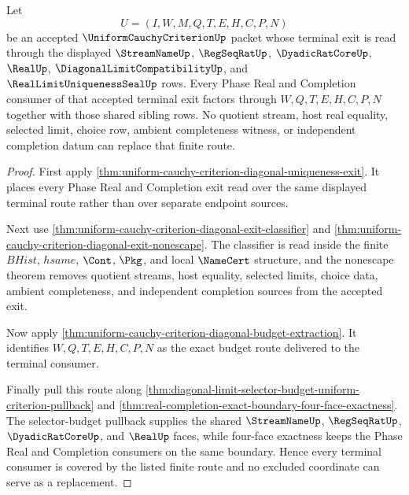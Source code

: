 \begin{theorem}
\label{thm:uniform-cauchy-criterion-exit-route-consumer-coverage}
Let
$$
U=(I,W,M,Q,T,E,H,C,P,N)
$$
be an accepted $\UniformCauchyCriterionUp$ packet whose terminal exit is read through the displayed $\StreamNameUp$, $\RegSeqRatUp$, $\DyadicRatCoreUp$, $\RealUp$, $\DiagonalLimitCompatibilityUp$, and $\RealLimitUniquenessSealUp$ rows. Every Phase Real and Completion consumer of that accepted terminal exit factors through $W,Q,T,E,H,C,P,N$ together with those shared sibling rows. No quotient stream, host real equality, selected limit, choice row, ambient completeness witness, or independent completion datum can replace that finite route.
\end{theorem}
\begin{proof}
First apply \autoref{thm:uniform-cauchy-criterion-diagonal-uniqueness-exit}. It places every Phase Real and Completion exit read over the same displayed terminal route rather than over separate endpoint sources.

Next use \autoref{thm:uniform-cauchy-criterion-diagonal-exit-classifier} and \autoref{thm:uniform-cauchy-criterion-diagonal-exit-nonescape}. The classifier is read inside the finite $BHist$, $hsame$, $\Cont$, $\Pkg$, and local $\NameCert$ structure, and the nonescape theorem removes quotient streams, host equality, selected limits, choice data, ambient completeness, and independent completion sources from the accepted exit.

Now apply \autoref{thm:uniform-cauchy-criterion-diagonal-budget-extraction}. It identifies $W,Q,T,E,H,C,P,N$ as the exact budget route delivered to the terminal consumer.

Finally pull this route along \autoref{thm:diagonal-limit-selector-budget-uniform-criterion-pullback} and \autoref{thm:real-completion-exact-boundary-four-face-exactness}. The selector-budget pullback supplies the shared $\StreamNameUp$, $\RegSeqRatUp$, $\DyadicRatCoreUp$, and $\RealUp$ faces, while four-face exactness keeps the Phase Real and Completion consumers on the same boundary. Hence every terminal consumer is covered by the listed finite route and no excluded coordinate can serve as a replacement.
\end{proof}

